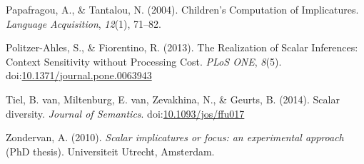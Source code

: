 \documentclass[floatsintext,man]{apa6}
\theoremstyle{definition}
\theoremstyle{definition}
\theoremstyle{definition}
\theoremstyle{remark}
\begin{document}
\hypertarget{ref-Papafragou2004}{}
Papafragou, A., \& Tantalou, N. (2004). Children's Computation of
Implicatures. \emph{Language Acquisition}, \emph{12}(1), 71--82.

\hypertarget{ref-Politzer-Ahles2013}{}
Politzer-Ahles, S., \& Fiorentino, R. (2013). The Realization of Scalar
Inferences: Context Sensitivity without Processing Cost. \emph{PLoS
ONE}, \emph{8}(5).
doi:\href{https://doi.org/10.1371/journal.pone.0063943}{10.1371/journal.pone.0063943}

\hypertarget{ref-VanTiel2014}{}
Tiel, B. van, Miltenburg, E. van, Zevakhina, N., \& Geurts, B. (2014).
Scalar diversity. \emph{Journal of Semantics}.
doi:\href{https://doi.org/10.1093/jos/ffu017}{10.1093/jos/ffu017}

\hypertarget{ref-Zondervan2010}{}
Zondervan, A. (2010). \emph{Scalar implicatures or focus: an
experimental approach} (PhD thesis). Universiteit Utrecht, Amsterdam.
\end{document}
